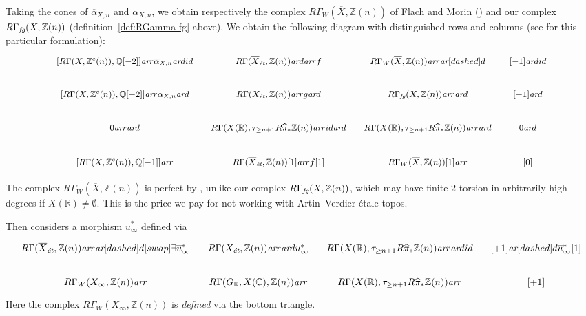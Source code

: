 \documentclass[draft,leqno,12pt]{article}
\theoremstyle{plain}
\theoremstyle{definition}
\newcommand{\ZZ}{\mathbb{Z}}
\newcommand{\QQ}{\mathbb{Q}}
\newcommand{\RR}{\mathbb{R}}
\newcommand{\CC}{\mathbb{C}}
\newcommand{\et}{\text{\it \'{e}t}}
\newcommand{\fg}{\text{\it fg}}
\newcommand{\ar}{\text{\it ar}}
\begin{document}
Taking the cones of $\overline{\alpha}_{X,n}$ and $\alpha_{X,n}$, we obtain
respectively the complex $R\Gamma_W (\overline{X}, \ZZ (n))$ of Flach and Morin
(\cite[Definition~3.6]{Flach-Morin-2018}) and our complex
$R\Gamma_\fg (X, \ZZ(n))$ (definition~\ref{def:RGamma-fg} above). We obtain the
following diagram with distinguished rows and columns
(see \cite[Proposition~1.4.6]{Neeman-2001} for this particular formulation):
\begin{equation}
  \label{eqn:cones-of-alphas}
  \begin{tikzcd}[column sep=1em,font=\small]
    {[R\Gamma (X, \ZZ^c (n)), \QQ [-2]]} \ar{r}{\overline{\alpha}_{X,n}}\ar{d}{id} & R\Gamma (\overline{X}_\et, \ZZ(n))\ar{d}\ar{r}{f} & R\Gamma_W (\overline{X}, \ZZ(n)) \ar{r}\ar[dashed]{d} & {[-1]}\ar{d}{id} \\
    {[R\Gamma (X, \ZZ^c (n)), \QQ [-2]]} \ar{r}{\alpha_{X,n}}\ar{d} & R\Gamma (X_\et, \ZZ(n)) \ar{r}{g}\ar{d} & R\Gamma_\fg (X, \ZZ(n)) \ar{r}\ar{d} & {[-1]}\ar{d} \\
    0\ar{r}\ar{d} & R\Gamma (X (\RR), \tau_{\ge n+1} R \widehat{\pi}_* \ZZ (n)) \ar{r}{id}\ar{d} & R\Gamma (X (\RR), \tau_{\ge n+1} R \widehat{\pi}_* \ZZ (n)) \ar{r}\ar{d} & 0\ar{d} \\
    {[R\Gamma (X, \ZZ^c (n)), \QQ [-1]]} \ar{r} & R\Gamma (\overline{X}_\et, \ZZ(n))[1]\ar{r}{f[1]} & R\Gamma_W (\overline{X}, \ZZ(n))[1] \ar{r} & {[0]}
  \end{tikzcd}
\end{equation}

The complex $R\Gamma_W (\overline{X}, \ZZ(n))$ is perfect by
\cite[Proposition~3.8]{Flach-Morin-2018}, unlike our complex
$R\Gamma_\fg (X, \ZZ(n))$,
which may have finite $2$-torsion in arbitrarily high degrees if
$X (\RR) \ne \emptyset$. This is the price we pay for not working with
Artin--Verdier \'{e}tale topos.

Then \cite[Definition~3.23]{Flach-Morin-2018} considers a morphism
$\overline{u}^*_\infty$ defined via
\begin{equation}
  \label{eqn:definition-of-u-bar-infty}
  \begin{tikzcd}[column sep=1em]
    R\Gamma (\overline{X}_\et, \ZZ(n)) \ar{r}\ar[dashed]{d}[swap]{\exists}{\overline{u}_\infty^*} & R\Gamma (X_\et, \ZZ(n)) \ar{r}\ar{d}{u_\infty^*} & R\Gamma (X(\RR), \tau_{\ge n+1} R \widehat{\pi}_* \ZZ (n)) \ar{r}\ar{d}{id} & {[+1]} \ar[dashed]{d}{\overline{u}_\infty^* [1]} \\
    R\Gamma_W (X_\infty, \ZZ (n)) \ar{r} & R\Gamma (G_\RR, X (\CC), \ZZ (n)) \ar{r} & R\Gamma (X(\RR), \tau_{\ge n+1} R \widehat{\pi}_* \ZZ (n)) \ar{r} & {[+1]}
  \end{tikzcd}
\end{equation}
Here the complex $R\Gamma_W (X_\infty, \ZZ(n))$ is \emph{defined} via the bottom
triangle.
\end{document}
